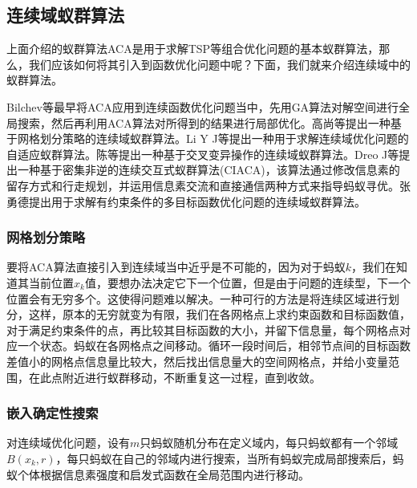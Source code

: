     \subsection{连续域蚁群算法}
        \par
        上面介绍的蚁群算法ACA是用于求解TSP等组合优化问题的基本蚁群算法，那么，我们应该如何将其引入到函数优化问题中呢？下面，我们就来介绍连续域中的蚁群算法。
        \par
        Bilchev等最早将ACA应用到连续函数优化问题当中，先用GA算法对解空间进行全局搜索，然后再利用ACA算法对所得到的结果进行局部优化。高尚等提出一种基于网格划分策略的连续域蚁群算法。Li Y J等提出一种用于求解连续域优化问题的自适应蚁群算法。陈等提出一种基于交叉变异操作的连续域蚁群算法。Dreo J等提出一种基于密集非逆的连续交互式蚁群算法(CIACA)，该算法通过修改信息素的留存方式和行走规划，并运用信息素交流和直接通信两种方式来指导蚂蚁寻优。张勇德提出用于求解有约束条件的多目标函数优化问题的连续域蚁群算法。
        \subsubsection{网格划分策略}
            \par
            要将ACA算法直接引入到连续域当中近乎是不可能的，因为对于蚂蚁$k$，我们在知道其当前位置$x_k$值，要想办法决定它下一个位置，但是由于问题的连续型，下一个位置会有无穷多个。这使得问题难以解决。一种可行的方法是将连续区域进行划分，这样，原本的无穷就变为有限，我们在各网格点上求约束函数和目标函数值，对于满足约束条件的点，再比较其目标函数的大小，并留下信息量，每个网格点对应一个状态。蚂蚁在各网格点之间移动。循环一段时间后，相邻节点间的目标函数差值小的网格点信息量比较大，然后找出信息量大的空间网格点，并给小变量范围，在此点附近进行蚁群移动，不断重复这一过程，直到收敛。
        \subsubsection{嵌入确定性搜索}
            \par
            对连续域优化问题，设有$m$只蚂蚁随机分布在定义域内，每只蚂蚁都有一个邻域$B(x_k,r)$，每只蚂蚁在自己的邻域内进行搜索，当所有蚂蚁完成局部搜索后，蚂蚁个体根据信息素强度和启发式函数在全局范围内进行移动。
